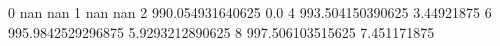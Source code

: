 0 nan nan
1 nan nan
2 990.054931640625 0.0
4 993.504150390625 3.44921875
6 995.9842529296875 5.9293212890625
8 997.506103515625 7.451171875
